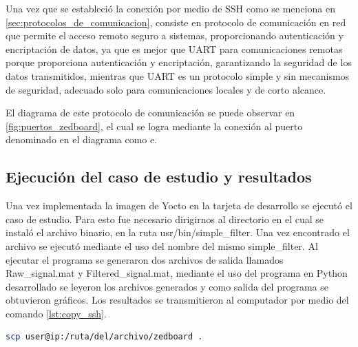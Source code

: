 Una vez que se estableció la conexión por medio de SSH como se menciona en \ref{sec:protocolos_de_comunicacion}, consiste en protocolo de comunicación en red que permite el acceso remoto seguro a sistemas, proporcionando autenticación y encriptación de datos, ya que es mejor que UART para comunicaciones remotas porque proporciona autenticación y encriptación, garantizando la seguridad de los datos transmitidos, mientras que UART es un protocolo simple y sin mecanismos de seguridad, adecuado solo para comunicaciones locales y de corto alcance. 

El diagrama de este protocolo de comunicación se puede observar en \ref{fig:puertos_zedboard}, el cual se logra mediante la conexión al puerto denominado en el diagrama como e.


\subsection{Ejecución del caso de estudio y resultados}

Una vez implementada la imagen de Yocto en la tarjeta de desarrollo se ejecutó el caso de estudio. Para esto fue necesario dirigirnos al directorio en el cual se instaló el archivo binario, en la ruta usr/bin/simple\_filter. Una vez encontrado el archivo se ejecutó mediante el uso del nombre del mismo simple\_filter. Al ejecutar el programa se generaron dos archivos de salida llamados Raw\_signal.mat y Filtered\_signal.mat, mediante el uso del programa en Python desarrollado se leyeron los archivos generados y como salida del programa se obtuvieron gráficos. Los resultados se transmitieron al computador por medio del comando \ref{lst:copy_ssh}.

\begin{lstlisting}[language=bash, caption={Copiar archivo por protocolo SSH, Linux}, label=lst:copy_ssh]
    scp user@ip:/ruta/del/archivo/zedboard .
\end{lstlisting}

